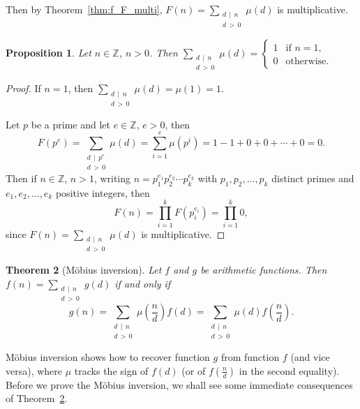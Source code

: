 \documentclass{amsbook}
\theoremstyle{plain}
\newtheorem{theorem}{Theorem}[chapter] %
\newtheorem{proposition}[theorem]{Proposition}
\theoremstyle{definition}
\theoremstyle{remark}
\numberwithin{equation}{chapter}
\numberwithin{figure}{chapter}
\newcommand{\Z}{\mathbb{Z}}
\begin{document}
Then by Theorem~\ref{thm:f_F_multi}, $F(n) = \sum_{\substack{d \, \mid \, n \\ d \, > \, 0}} \mu (d)$ is multiplicative.
\begin{proposition}\label{prop:sum_mu}
  Let $n \in \Z$, $n > 0$. Then $\sum_{\substack{d \, \mid \, n \\ d \, > \, 0}} \mu (d) = \left\{ \begin{array}{rl}
                                                                                                     1 & \text{if $n = 1$,} \\[1mm]
                                                                                                     0 & \text{otherwise.}
                                                                                                         \end{array} \right.$
\end{proposition}
\begin{proof}
  If $n = 1$, then $\sum_{\substack{d \, \mid \, n \\ d \, > \, 0}} \mu (d) = \mu (1) = 1$.

  Let $p$ be a prime and let $e \in \Z$, $e > 0$, then
  \[
    F(p^e) = \sum_{\substack{d \, \mid \, p^e \\ d \, > \, 0}} \mu (d) = \sum_{i=1}^e \mu (p^i) 
    = 1 - 1 + 0 + 0 + \cdots + 0 = 0.
  \]
  Then if $n \in \Z$, $n > 1$, writing $n = p_1^{e_1} p_2^{e_2} \cdots p_k^{e_k}$ with $p_1, p_2, \ldots, p_k$ distinct primes and $e_1, e_2, \ldots, e_k$ positive integers, then
  \[
    F(n) = \prod_{i=1}^k F(p_i^{e_i}) 
         = \prod_{i=1}^k 0,
  \]
  since $F(n) = \sum_{\substack{d \, \mid \, n \\ d \, > \, 0}} \mu (d)$ is multiplicative.
\end{proof}

\begin{theorem}[M\"obius inversion]\label{thm:mobius_inv}
  Let $f$ and $g$ be arithmetic functions. Then $f(n) = \sum_{\substack{d \, \mid \, n \\ d \, > \, 0}} g(d)$ if and only if
  \[
    g(n) = \sum_{\substack{d \, \mid \, n \\ d \, > \, 0}} \mu \left(\frac{n}d\right) f(d) = \sum_{\substack{d \, \mid \, n \\ d \, > \, 0}} \mu (d) f\left(\frac{n}d\right).
  \]
\end{theorem}

M\"obius inversion shows how to recover function $g$ from function $f$ (and vice versa), where $\mu$ tracks the sign of $f(d)$ (or of $f\left( \frac{n}d \right)$ in the second equality). Before we prove the M\"obius inversion, we shall see some immediate consequences of Theorem~\ref{thm:mobius_inv}.
\end{document}
